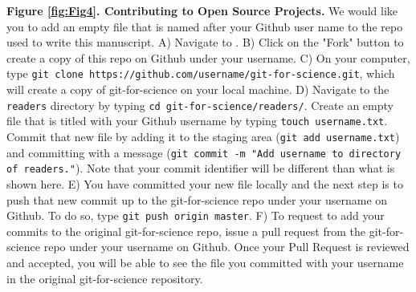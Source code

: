 \textbf{Figure \ref{fig:Fig4}. Contributing to Open Source Projects.}
We would like you to add an empty file that is named after your Github user name to the repo used to write this manuscript. 
A) Navigate to \href{https://github.com/jdblischak/git-for-science}{}. 
B) Click on the "Fork" button to create a copy of this repo on Github under your username. 
C) On your computer, type \verb|git clone https://github.com/username/git-for-science.git|, which will create a copy of git-for-science on your local machine.
D) Navigate to the \verb|readers| directory by typing \verb|cd git-for-science/readers/|. 
Create an empty file that is titled with your Github username by typing \verb|touch username.txt|. 
Commit that new file by adding it to the staging area (\verb|git add username.txt|) and committing with a message (\verb|git commit -m "Add username to directory of readers."|). 
Note that your commit identifier will be different than what is shown here.
E) You have committed your new file locally and the next step is to push that new commit up to the git-for-science repo under your username on Github. 
To do so, type \verb|git push origin master|. 
F) To request to add your commits to the original git-for-science repo, issue a pull request from the git-for-science repo under your username on Github. 
Once your Pull Request is reviewed and accepted, you will be able to see the file you committed with your username in the original git-for-science repository.

  
  
  
  